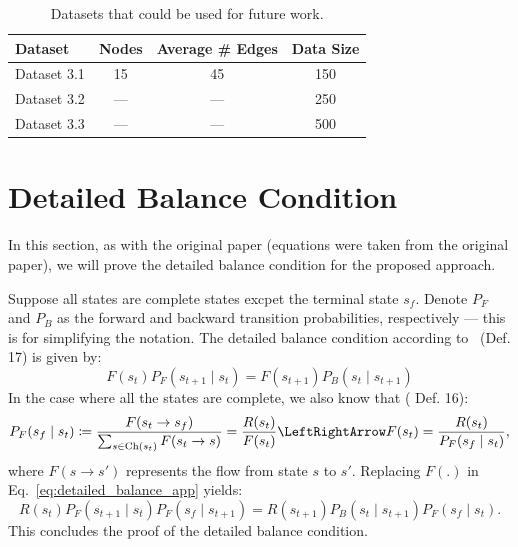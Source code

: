 \documentclass{lxaiproposal}
\begin{document}
    \begin{table}[h]
        \centering
        \begin{tabular}{|l|c|c|c|}
            \hline
            \textbf{Dataset} & \textbf{Nodes} & \textbf{Average \# Edges} & \textbf{Data Size} \\
            \hline
            Dataset 3.1      & 15             & 45                        & 150                \\
            Dataset 3.2      & ---            & ---                       & 250                \\
            Dataset 3.3      & ---            & ---                       & 500                \\
            \hline
        \end{tabular}
        \caption{Datasets that could be used for future work.}
        \label{tab:future_dataset}
    \end{table}


    \pagebreak
    \newpage
    \clearpage
    
    

    \makeappendix

    \appendix

    \renewcommand\theequation{\thesection\arabic{equation}}


    \section{Detailed Balance Condition}\label{app:detailed_balance}
    \vspace*{-3mm}

    In this section, as with the original paper (equations were taken from the original paper), we will prove the detailed balance condition
    for the proposed approach.

    Suppose all states are complete states excpet the terminal state $s_f$. Denote $P_F$ and $P_B$ as the forward
    and backward transition probabilities, respectively --- this is for simplifying the notation. The detailed balance
    condition according to~\cite{bengio2023gflownetfoundations} (Def. 17) is given by:
    \begin{equation}
        F(s_t)P_F(s_{t+1} \mid s_t) = F(s_{t+1})P_B(s_t \mid s_{t+1})
        \label{eq:detailed_balance_app}
    \end{equation}
    In the case where all the states are complete, we also know that (\cite{bengio2023gflownetfoundations} Def. 16):
    \[
        P_F(s_f \mid s_t) \coloneq \frac{F(s_t \to s_f)}{\sum_{s \in \text{Ch}(s_t)} F(s_t \to s)} = \frac{R(s_t)}{F(s_t)}
        \LeftRightArrow F(s_t) = \frac{R(s_t)}{P_F(s_f \mid s_t)},
    \]
    where $F(s \to s')$ represents the flow from state $s$ to  $s'$. Replacing $F(.)$ in Eq.~\eqref{eq:detailed_balance_app}
    yields:
    \begin{equation}
        R(s_t)P_F(s_{t+1} \mid s_t)P_F(s_f \mid s_{t+1}) = R(s_{t+1})P_B(s_t \mid s_{t+1})P_F(s_f \mid s_t).
        \label{eq:detailed_balance_app2}
    \end{equation}
    This concludes the proof of the detailed balance condition.
\end{document}
